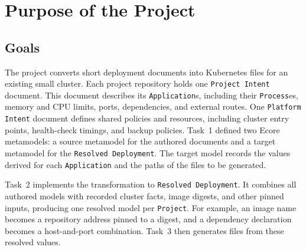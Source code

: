 \section{Purpose of the Project}
\label{sec:purpose}

\subsection{Goals}
\label{sec:goals}

The project converts short deployment documents into Kubernetes files for an
existing small cluster. Each project repository holds one
\texttt{Project Intent} document. This document describes its \texttt{Application}s, including their \texttt{Process}es, memory and CPU limits, ports, dependencies, and external routes. One \texttt{Platform Intent} document defines shared
policies and resources, including cluster entry points, health-check timings,
and backup policies. Task~1 defined two Ecore metamodels: a source metamodel
for the authored documents and a target metamodel for the
\texttt{Resolved Deployment}. The target model records the values derived for
each \texttt{Application} and the paths of the files to be generated.

Task~2 implements the transformation to \texttt{Resolved Deployment}.
It combines all authored models with recorded cluster facts, image digests,
and other pinned inputs, producing one resolved model per \texttt{Project}.
For example, an image name becomes a repository address pinned to a digest,
and a dependency declaration becomes a host-and-port combination. Task~3 then
generates files from these resolved values.

